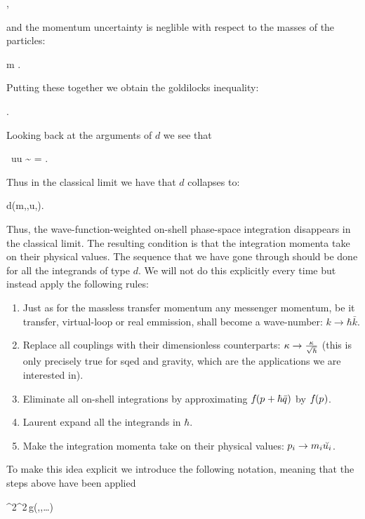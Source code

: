 \documentclass[
  11pt,
  a4paper,
  DIV=11,
  numbers=noendperiod,
  oneside]{scrreprt}
\providecommand{\tightlist}{%
  \setlength{\itemsep}{0pt}\setlength{\parskip}{0pt}}\usepackage{longtable,booktabs,array}
\let\[\relax \let\]\relax %
\DeclareRobustCommand{\[}{\begin{equation}}
\DeclareRobustCommand{\]}{\end{equation}}
\begin{document}
\[
\wfwidth\ll \scatlen,
\]

and the momentum uncertainty is neglible with respect to the masses of
the particles:

\[
\frac{\hbar}{\wfwidth}\ll m \implies \comptlen\ll \wfwidth.
\]

Putting these together we obtain the goldilocks inequality:

\[
\comptlen\ll\wfwidth\ll\scatlen.
\]

Looking back at the arguments of \(d\) we see that

\[
\scatlen\, \tw \cdot u\gg\wfwidth \tw \cdot u \sim \sqrt{\xi} =   \frac{\comptlen}{\wfwidth}\gg\frac{\comptlen}{\scatlen}.
\]

Thus in the classical limit we have that \(d\) collapses to:

\[
d(m,\xi,u,\tm)\propto{}.
\]

Thus, the wave-function-weighted on-shell phase-space integration
disappears in the classical limit. The resulting condition is that the
integration momenta take on their physical values. The sequence that we
have gone through should be done for all the integrands of type \(d\).
We will not do this explicitly every time but instead apply the
following rules:

\begin{enumerate}
\def\labelenumi{\arabic{enumi}.}
\tightlist
\item
  Just as for the massless transfer momentum any messenger momentum, be
  it transfer, virtual-loop or real emmission, shall become a
  wave-number: \(k\to \hbar \bar{k}\).
\item
  Replace all couplings with their dimensionless counterparts:
  \(\coupling\to \frac{\coupling}{\sqrt{\hbar} }\) (this is only
  precisely true for \gls{sqed} and gravity, which are the applications
  we are interested in).
\item
  Eliminate all on-shell integrations by approximating
  \(\wf(\emom+\hbar\tw)\) by \(\wf(\emom)\).
\item
  Laurent expand all the integrands in \(\hbar\).
\item
  Make the integration momenta take on their physical values:
  \(\emom[i]\to \mass[i]\cls{\vel[i]}\).
\end{enumerate}

To make this idea explicit we introduce the following notation, meaning
that the steps above have been applied

\[
 \int\limits \ddP{\emom[1]}\ddP{\emom[2]} \abs{\wf[1](\emom[1])}^2\abs{\wf[2](\emom[2])}^2\,g(\emom[1],\emom[2],\dots)
\]
\end{document}

